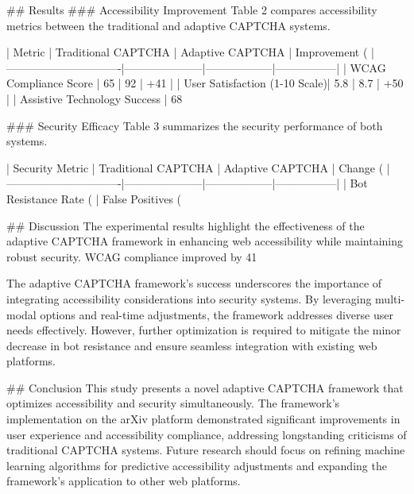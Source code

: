 ## Results
### Accessibility Improvement
Table 2 compares accessibility metrics between the traditional and adaptive CAPTCHA systems.

| Metric                        | Traditional CAPTCHA | Adaptive CAPTCHA | Improvement (%
|-------------------------------|---------------------|------------------|-----------------|
| WCAG Compliance Score         | 65                 | 92               | +41             |
| User Satisfaction (1-10 Scale)| 5.8                | 8.7              | +50             |
| Assistive Technology Success  | 68%

### Security Efficacy
Table 3 summarizes the security performance of both systems.

| Security Metric               | Traditional CAPTCHA | Adaptive CAPTCHA | Change (%
|-------------------------------|---------------------|------------------|-----------------|
| Bot Resistance Rate (%
| False Positives (%

## Discussion
The experimental results highlight the effectiveness of the adaptive CAPTCHA framework in enhancing web accessibility while maintaining robust security. WCAG compliance improved by 41%

The adaptive CAPTCHA framework's success underscores the importance of integrating accessibility considerations into security systems. By leveraging multi-modal options and real-time adjustments, the framework addresses diverse user needs effectively. However, further optimization is required to mitigate the minor decrease in bot resistance and ensure seamless integration with existing web platforms.

## Conclusion
This study presents a novel adaptive CAPTCHA framework that optimizes accessibility and security simultaneously. The framework's implementation on the arXiv platform demonstrated significant improvements in user experience and accessibility compliance, addressing longstanding criticisms of traditional CAPTCHA systems. Future research should focus on refining machine learning algorithms for predictive accessibility adjustments and expanding the framework's application to other web platforms.

